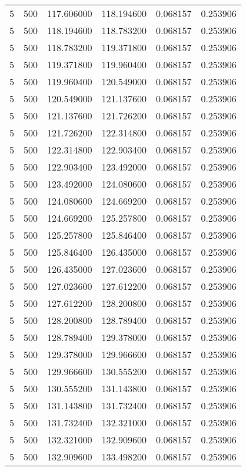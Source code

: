 \begin{longtable}{rrrrrr}
5 & 500 & 117.606000 & 118.194600 & 0.068157 & 0.253906 \\
5 & 500 & 118.194600 & 118.783200 & 0.068157 & 0.253906 \\
5 & 500 & 118.783200 & 119.371800 & 0.068157 & 0.253906 \\
5 & 500 & 119.371800 & 119.960400 & 0.068157 & 0.253906 \\
5 & 500 & 119.960400 & 120.549000 & 0.068157 & 0.253906 \\
5 & 500 & 120.549000 & 121.137600 & 0.068157 & 0.253906 \\
5 & 500 & 121.137600 & 121.726200 & 0.068157 & 0.253906 \\
5 & 500 & 121.726200 & 122.314800 & 0.068157 & 0.253906 \\
5 & 500 & 122.314800 & 122.903400 & 0.068157 & 0.253906 \\
5 & 500 & 122.903400 & 123.492000 & 0.068157 & 0.253906 \\
5 & 500 & 123.492000 & 124.080600 & 0.068157 & 0.253906 \\
5 & 500 & 124.080600 & 124.669200 & 0.068157 & 0.253906 \\
5 & 500 & 124.669200 & 125.257800 & 0.068157 & 0.253906 \\
5 & 500 & 125.257800 & 125.846400 & 0.068157 & 0.253906 \\
5 & 500 & 125.846400 & 126.435000 & 0.068157 & 0.253906 \\
5 & 500 & 126.435000 & 127.023600 & 0.068157 & 0.253906 \\
5 & 500 & 127.023600 & 127.612200 & 0.068157 & 0.253906 \\
5 & 500 & 127.612200 & 128.200800 & 0.068157 & 0.253906 \\
5 & 500 & 128.200800 & 128.789400 & 0.068157 & 0.253906 \\
5 & 500 & 128.789400 & 129.378000 & 0.068157 & 0.253906 \\
5 & 500 & 129.378000 & 129.966600 & 0.068157 & 0.253906 \\
5 & 500 & 129.966600 & 130.555200 & 0.068157 & 0.253906 \\
5 & 500 & 130.555200 & 131.143800 & 0.068157 & 0.253906 \\
5 & 500 & 131.143800 & 131.732400 & 0.068157 & 0.253906 \\
5 & 500 & 131.732400 & 132.321000 & 0.068157 & 0.253906 \\
5 & 500 & 132.321000 & 132.909600 & 0.068157 & 0.253906 \\
5 & 500 & 132.909600 & 133.498200 & 0.068157 & 0.253906 \\

\end{longtable}
